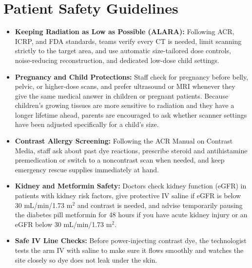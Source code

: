 \section{Patient Safety Guidelines}
\begin{itemize}
    \item \textbf{Keeping Radiation as Low as Possible (ALARA):} Following ACR, ICRP, and FDA standards, teams verify every CT is needed, limit scanning strictly to the target area, and use automatic size-tailored dose controls, noise-reducing reconstruction, and dedicated low-dose child settings.
    \item \textbf{Pregnancy and Child Protections:} Staff check for pregnancy before belly, pelvic, or higher-dose scans, and prefer ultrasound or MRI whenever they give the same medical answer in children or pregnant patients. Because children's growing tissues are more sensitive to radiation and they have a longer lifetime ahead, parents are encouraged to ask whether scanner settings have been adjusted specifically for a child's size.
    \item \textbf{Contrast Allergy Screening:} Following the ACR Manual on Contrast Media, staff ask about past dye reactions, prescribe steroid and antihistamine premedication or switch to a noncontrast scan when needed, and keep emergency rescue supplies immediately at hand.
    \item \textbf{Kidney and Metformin Safety:} Doctors check kidney function (eGFR) in patients with kidney risk factors, give protective IV saline if eGFR is below 30 mL/min/1.73 m$^2$ and contrast is needed, and advise temporarily pausing the diabetes pill metformin for 48 hours if you have acute kidney injury or an eGFR below 30 mL/min/1.73 m$^2$.
    \item \textbf{Safe IV Line Checks:} Before power-injecting contrast dye, the technologist tests the arm IV with saline to make sure it flows smoothly and watches the site closely so dye does not leak under the skin.
\end{itemize}

